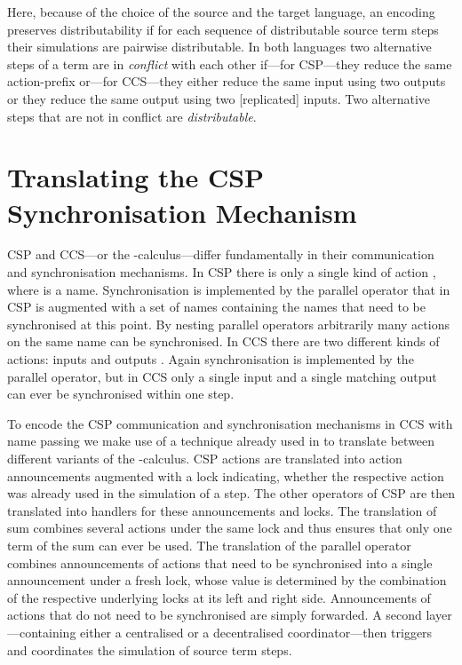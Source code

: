 \documentclass[copyright,creativecommons]{eptcs}
\begin{document}
\noindent
Here, because of the choice of the source and the target language, an encoding preserves distributability if for each sequence of distributable source term steps their simulations are pairwise distributable. 
In both languages two alternative steps of a term are in \emph{conflict} with each other if---for CSP---they reduce the same action-prefix or---for CCS---they either reduce the same input using two outputs or they reduce the same output using two [replicated] inputs. 
Two alternative steps that are not in conflict are \emph{distributable}.

\section{Translating the CSP Synchronisation Mechanism}
\label{sec:innerPart}

CSP and CCS---or the -calculus---differ fundamentally in their communication and synchronisation mechanisms.
In CSP there is only a single kind of action , where  is a name. 
Synchronisation is implemented by the parallel operator  that in CSP is augmented with a set of names  containing the names that need to be synchronised at this point. 
By nesting parallel operators arbitrarily many actions on the same name can be synchronised.
In CCS there are two different kinds of actions: inputs  and outputs . Again synchronisation is implemented by the parallel operator, but in CCS only a single input and a single matching output can ever be synchronised within one step.

To encode the CSP communication and synchronisation mechanisms in CCS with name passing we make use of a technique already used in \cite{petersNestmann12, peters12} to translate between different variants of the -calculus. CSP actions are translated into action announcements augmented with a lock indicating, whether the respective action was already used in the simulation of a step. The other operators of CSP are then translated into handlers for these announcements and locks.
The translation of sum combines several actions under the same lock and thus ensures that only one term of the sum can ever be used.
The translation of the parallel operator combines announcements of actions that need to be synchronised into a single announcement under a fresh lock, whose value is determined by the combination of the respective underlying locks at its left and right side. Announcements of actions that do not need to be synchronised are simply forwarded.
A second layer---containing either a centralised or a decentralised coordinator---then triggers and coordinates the simulation of source term steps.
\end{document}
